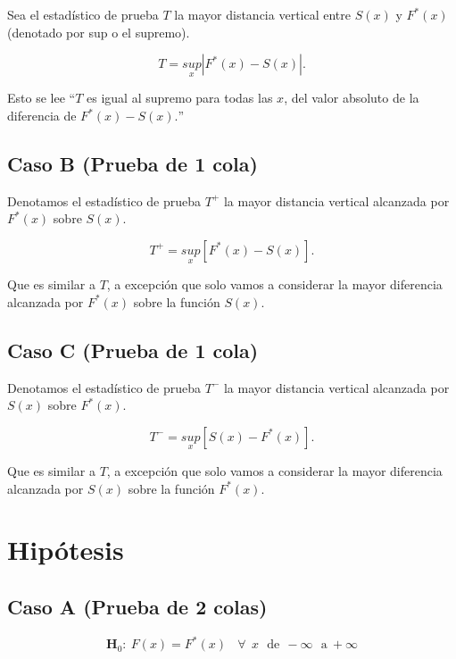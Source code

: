 \documentclass[
  a4paper,
  oneside,
  openany]{book}
\begin{document}
Sea el estadístico de prueba \(T\) la mayor distancia vertical entre \(S(x)\) y \(F^*(x)\)(denotado por sup o el supremo).

\[T=\underset{x}{sup}|F^*(x)-S(x)|.\]

Esto se lee ``\(T\) es igual al supremo para todas las \(x\), del valor absoluto de la diferencia de \(F^*(x)-S(x).\)''

\hypertarget{caso-b-prueba-de-1-cola}{%
\subsection*{Caso B (Prueba de 1 cola)}\label{caso-b-prueba-de-1-cola}}


Denotamos el estadístico de prueba \(T^+\) la mayor distancia vertical alcanzada por \(F^*(x)\) sobre \(S(x)\).

\[T^+=\underset{x}{sup}[F^*(x)-S(x)].\]

Que es similar a \(T\), a excepción que solo vamos a considerar la mayor diferencia alcanzada por \(F^*(x)\) sobre la función \(S(x)\).

\hypertarget{caso-c-prueba-de-1-cola}{%
\subsection*{Caso C (Prueba de 1 cola)}\label{caso-c-prueba-de-1-cola}}


Denotamos el estadístico de prueba \(T^-\) la mayor distancia vertical alcanzada por \(S(x)\) sobre \(F^*(x)\).

\[T^-=\underset{x}{sup}[S(x)-F^*(x)].\]

Que es similar a \(T\), a excepción que solo vamos a considerar la mayor diferencia alcanzada por \(S(x)\) sobre la función \(F^*(x)\).

\hypertarget{hipuxf3tesis-13}{%
\section{Hipótesis}\label{hipuxf3tesis-13}}

\hypertarget{caso-a-prueba-de-2-colas-1}{%
\subsection*{Caso A (Prueba de 2 colas)}\label{caso-a-prueba-de-2-colas-1}}


\[\textbf{H}_0:\ F(x)=F^*(x) \ \ \ \ \forall \ \ x \ \ \  \mbox{de}\  \ -\infty \ \ \ \mbox{a} \  +\infty \]
\end{document}
